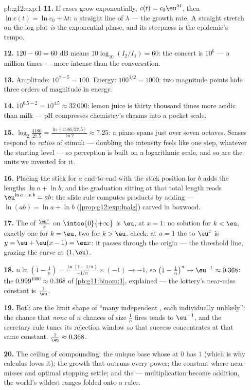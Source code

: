 \begin{solution}{pb:g12:exp:1}
\textbf{11.} If cases grow exponentially, $c(t) = c_0
\eu^{\lambda t}$, then $\ln c(t) = \ln c_0 + \lambda t$: a
straight line of  $\lambda$ --- the growth rate. A
straight stretch on the log plot \emph{is} the exponential
phase, and its steepness is the epidemic's tempo.

\textbf{12.} $120 - 60 = 60$ dB means
$10\log_{10}(I_2/I_1) = 60$: the concert is
$10^6$ --- a million times --- more intense than the
conversation.

\textbf{13.} Amplitude: $10^{7-5} = 100$. Energy:
$100^{3/2} = 1000$: two magnitude points hide three orders of
magnitude in energy.

\textbf{14.} $10^{6.5 - 2} = 10^{4.5} \approx 32\,000$: lemon
juice is thirty thousand times more acidic than milk --- pH
compresses chemistry's chasms into a pocket scale.

\textbf{15.} $\log_2\!\frac{4186}{27.5} =
\frac{\ln(4186/27.5)}{\ln 2} \approx 7.25$: a piano spans just
over seven octaves. Senses respond to \emph{ratios} of stimuli
--- doubling the intensity feels like one step, whatever the
starting level --- so perception is built on a logarithmic
scale, and so are the units we invented for it.

\textbf{16.} Placing the stick for $a$ end-to-end with the
stick position for $b$ adds the lengths $\ln a + \ln b$, and
the graduation sitting at that total length reads
$\eu^{\ln a + \ln b} = ab$: the slide rule computes products
by adding  --- $\ln(ab) = \ln a + \ln b$
(\cref{prop:g12:exp:lnalg}) carved in boxwood.

\textbf{17.} The  of $\frac{\eu^x}{x}$ on
$\intoo{0}{+\infty}$ is $\eu$, at $x = 1$: no solution for
$k < \eu$, exactly one for $k = \eu$, two for $k > \eu$.
 check: at $a = 1$ the  to $\eu^x$ is
$y = \eu + \eu(x - 1) = \eu x$: it passes through the origin
--- the threshold line, grazing the curve at $(1, \eu)$.

\textbf{18.} $n \ln\!\left(1 - \frac1n\right) =
\frac{\ln(1 - 1/n)}{-1/n} \times (-1) \to -1$, so
$\left(1 - \frac1n\right)^n \to \eu^{-1} \approx 0.368$: the
$0.999^{1000} \approx 0.368$ of \cref{pb:g11:binom:1},
explained --- the lottery's near-miss constant is
$\frac1\eu$.

\textbf{19.} Both are the limit shape of ``many independent
, each individually unlikely'': the chance that
\emph{none} of $n$ chances of size $\frac1n$ fires tends to
$\eu^{-1}$, and the secretary rule tunes its rejection window
so that success concentrates at that same constant.
$\frac1\eu \approx 0.368$.

\textbf{20.} The ceiling of compounding; the unique base whose
 at $0$ has  $1$ (which is why calculus loves it);
the growth that outruns every power; the constant where
near-misses and optimal stopping settle; and the  ---
multiplication become addition, the world's wildest ranges
folded onto a ruler.
\end{solution}
